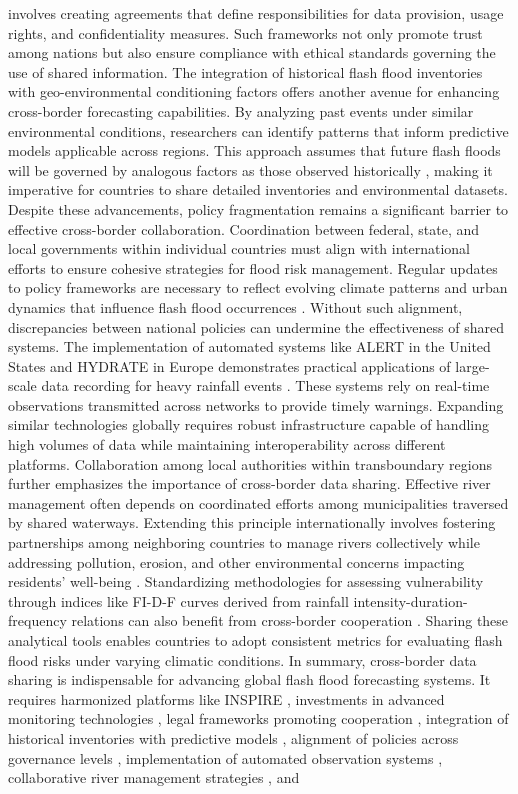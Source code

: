 involves creating agreements that define responsibilities for data provision, usage rights, and confidentiality measures. Such frameworks not only promote trust among nations but also ensure compliance with ethical standards governing the use of shared information. The integration of historical flash flood inventories with geo-environmental conditioning factors offers another avenue for enhancing cross-border forecasting capabilities. By analyzing past events under similar environmental conditions, researchers can identify patterns that inform predictive models applicable across regions. This approach assumes that future flash floods will be governed by analogous factors as those observed historically \citep{Ngo2018}, making it imperative for countries to share detailed inventories and environmental datasets. Despite these advancements, policy fragmentation remains a significant barrier to effective cross-border collaboration. Coordination between federal, state, and local governments within individual countries must align with international efforts to ensure cohesive strategies for flood risk management. Regular updates to policy frameworks are necessary to reflect evolving climate patterns and urban dynamics that influence flash flood occurrences \citep{Saad2024}. Without such alignment, discrepancies between national policies can undermine the effectiveness of shared systems. The implementation of automated systems like ALERT in the United States and HYDRATE in Europe demonstrates practical applications of large-scale data recording for heavy rainfall events \citep{Khan2020}. These systems rely on real-time observations transmitted across networks to provide timely warnings. Expanding similar technologies globally requires robust infrastructure capable of handling high volumes of data while maintaining interoperability across different platforms. Collaboration among local authorities within transboundary regions further emphasizes the importance of cross-border data sharing. Effective river management often depends on coordinated efforts among municipalities traversed by shared waterways. Extending this principle internationally involves fostering partnerships among neighboring countries to manage rivers collectively while addressing pollution, erosion, and other environmental concerns impacting residents' well-being \citep{Saad2024}. Standardizing methodologies for assessing vulnerability through indices like FI-D-F curves derived from rainfall intensity-duration-frequency relations can also benefit from cross-border cooperation \citep{Kim2011}. Sharing these analytical tools enables countries to adopt consistent metrics for evaluating flash flood risks under varying climatic conditions. In summary, cross-border data sharing is indispensable for advancing global flash flood forecasting systems. It requires harmonized platforms like INSPIRE \citep{Ritter2021a}\citep{Ritter2021b}, investments in advanced monitoring technologies \citep{Msigwa2024}, legal frameworks promoting cooperation \citep{Saad2024}, integration of historical inventories with predictive models \citep{Ngo2018}, alignment of policies across governance levels \citep{Saad2024}, implementation of automated observation systems \citep{Khan2020}, collaborative river management strategies \citep{Saad2024}, and 